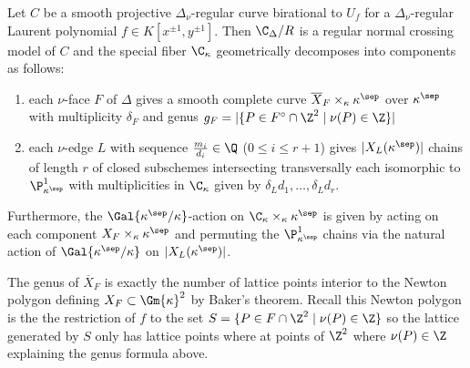 \begin{theorem}
Let $C$ be a smooth projective $\Delta_\nu$-regular curve birational to $U_f$ for a $\Delta_\nu$-regular Laurent polynomial $f \in K[x^{\pm 1}, y^{\pm 1}]$. Then $\C_\Delta / R$ is a regular normal crossing model of $C$ and the special fiber $\C_\kappa$ geometrically decomposes into components as follows:
\begin{enumerate}
\item each $\nu$-face $F$ of $\Delta$ gives a smooth complete curve $\overline{X}_F \times_\kappa \kappa^{\sep}$ over $\kappa^\sep$ with multiplicity $\delta_F$ and genus $g_F = |\{ P \in F^\circ \cap \Z^2 \mid \nu(P) \in \Z \} |$
\item each $\nu$-edge $L$ with sequence $\frac{m_i}{d_i} \in \Q$ ($0 \le i \le r + 1$) gives $|X_L(\kappa^\sep)|$ chains of length $r$ of closed subschemes intersecting transversally each isomorphic to $\P^1_{\kappa^{\sep}}$ with multiplicities in $\C_\kappa$ given by $\delta_L d_1, \dots, \delta_L d_r$.
\end{enumerate}
Furthermore, the $\Gal{\kappa^\sep / \kappa}$-action on $\C_{\kappa} \times_\kappa \kappa^{\sep}$ is given by acting on each component $X_F \times_\kappa \kappa^\sep$ and permuting the $\P^1_{\kappa^\sep}$ chains via the natural action of $\Gal{\kappa^\sep / \kappa}$ on $|X_L(\kappa^\sep)|$. 
\end{theorem}

\begin{rmk}
The genus of $\overline{X}_F$ is exactly the number of lattice points interior to the Newton polygon defining $X_F \subset \Gm{\kappa}^2$ by Baker's theorem. Recall this Newton polygon is the the restriction of $f$ to the set $S = \{ P \in F \cap \Z^2 \mid \nu(P) \in \Z \}$ so the lattice generated by $S$ only has lattice points where at points of $\Z^2$ where $\nu(P) \in \Z$ explaining the genus formula above. 
\end{rmk}

